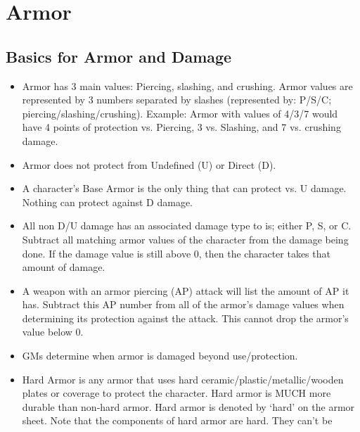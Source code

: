 \documentclass[twoside]{book}
\begin{document}
\section{Armor}
    
    

\subsection{Basics for Armor and Damage}
    
\begin{itemize}
      
  \item   Armor has 3 main values: Piercing, slashing, and
                 crushing. Armor values are represented by 3 numbers
                 separated by slashes (represented by: P/S/C;
                 piercing/slashing/crushing). Example: Armor with values
                 of 4/3/7 would have 4 points of protection vs. Piercing,
                 3 vs. Slashing, and 7 vs. crushing damage. 
  \item   Armor does not protect from Undefined (U) or
                 Direct (D). 
  \item   A character's Base Armor is the only thing
                 that can protect vs. U damage. Nothing can protect
                 against D damage. 
  \item   All non D/U damage has an associated damage type
                 to is; either P, S, or C. Subtract all matching armor
                 values of the character from the damage being done. If
                 the damage value is still above 0, then the character
                 takes that amount of damage. 
  \item   A weapon with an armor piercing (AP) attack will
                 list the amount of AP it has. Subtract this AP number
                 from all of the armor's damage values when
                 determining its protection against the attack. This
                 cannot drop the armor's value below 0. 
  \item   GMs determine when armor is damaged beyond
                 use/protection. 
  \item   Hard Armor is any armor that uses hard
                 ceramic/plastic/metallic/wooden plates or coverage to
                 protect the character. Hard armor is MUCH more durable
                 than non-hard armor. Hard armor is denoted by
                 `hard' on the armor sheet. Note that the
                 components of hard armor are hard. They can't be

\end{itemize}
\end{document}
